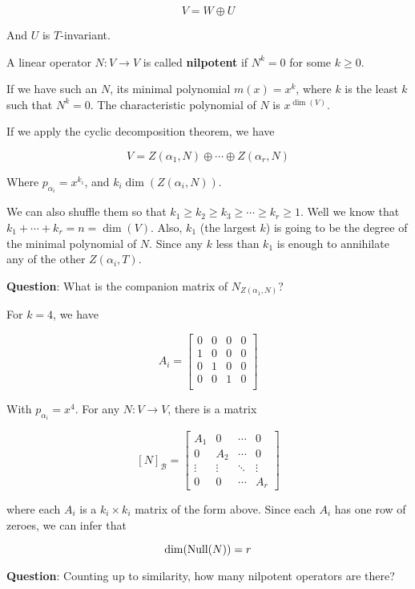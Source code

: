 \documentclass[12pt]{article}
\def\B{\mathcal B}
\begin{document}
  \[
    V = W \oplus U
  \]

  And $U$ is $T$-invariant.

  \Definition{}
  {
    A linear operator $N: V \to V$ is called {\bf nilpotent} if $N^k = 0$ for
    some $k \ge 0$.
  }

  If we have such an $N$, its minimal polynomial $m(x) = x^k$, where $k$ is the
  least $k$ such that $N^k = 0$. The characteristic polynomial of $N$ is
  $x^{\dim(V)}$.

  If we apply the cyclic decomposition theorem, we have

  \[
    V = Z(\alpha_1, N) \oplus \cdots \oplus Z(\alpha_r, N)
  \]

  Where $p_{\alpha_i} = x^{k_i}$, and $k_i \dim(Z(\alpha_i, N))$.

  We can also shuffle them so that $k_1 \ge k_2 \ge k_3 \ge \cdots \ge k_r \ge
  1$. Well we know that $k_1 + \cdots + k_r = n = \dim(V)$. Also, $k_1$ (the
  largest $k$) is going to be the degree of the minimal polynomial of $N$. Since
  any $k$ less than $k_1$ is enough to annihilate any of the other $Z(\alpha_i,
  T)$.

  {\bf Question}: What is the companion matrix of $N_{Z(\alpha_1, N)}$?

  For $k = 4$, we have

  \[
    A_i = \begin{bmatrix}
      0 & 0 & 0 & 0 \\
      1 & 0 & 0 & 0 \\
      0 & 1 & 0 & 0 \\
      0 & 0 & 1 & 0 \\
    \end{bmatrix}
  \]

  With $p_{\alpha_i} = x^4$. For any $N: V \to V$, there is a matrix

  \[
    [N]_\B = \begin{bmatrix}
      A_1 & 0 & \cdots & 0 \\
      0 & A_2 & \cdots & 0 \\
      \vdots & \vdots & \ddots & \vdots \\
      0 & 0 & \cdots & A_r
    \end{bmatrix}
  \]

  where each $A_i$ is a $k_i \times k_i$ matrix of the form above. Since each
  $A_i$ has one row of zeroes, we can infer that

  \[
    \dim(\mathrm{Null}(N)) = r
  \]

  {\bf Question}: Counting up to similarity, how many nilpotent operators are
  there?
\end{document}
